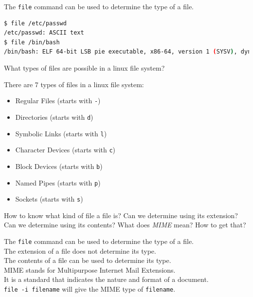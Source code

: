 The \texttt{file} command can be used to determine the type of a file.

\begin{lstlisting}[language=bash]
$ file /etc/passwd
/etc/passwd: ASCII text
$ file /bin/bash
/bin/bash: ELF 64-bit LSB pie executable, x86-64, version 1 (SYSV), dynamically linked, interpreter /lib64/ld-linux-x86-64.so.2, BuildID[sha1]=165d3a5ffe12a4f1a9b71c84f48d94d5e714d3db, for GNU/Linux 4.4.0, stripped
\end{lstlisting}

\begin{qs}
  What types of files are possible in a linux file system?
\end{qs}

\begin{ans}
  There are 7 types of files in a linux file system:
  \begin{itemize}
    \item Regular Files (starts with \texttt{-})
    \item Directories (starts with \texttt{d})
    \item Symbolic Links (starts with \texttt{l})
    \item Character Devices (starts with \texttt{c})
    \item Block Devices (starts with \texttt{b})
    \item Named Pipes (starts with \texttt{p})
    \item Sockets (starts with \texttt{s})
  \end{itemize}
\end{ans}

\begin{qs}
  How to know what kind of file a file is? Can we determine using
  its extension? Can we determine using its contents? What does
  \textit{MIME} mean?
How to get that?
\end{qs}

\begin{ans}
  The \texttt{file} command can be used to determine the type of a file. \\
  The extension of a file does not determine its type. \\
  The contents of a file can be used to determine its type. \\
  MIME stands for Multipurpose Internet Mail Extensions. \\
  It is a standard that indicates the nature and format of a document. \\
  \texttt{file -i filename} will give the MIME type of \texttt{filename}.
\end{ans}

